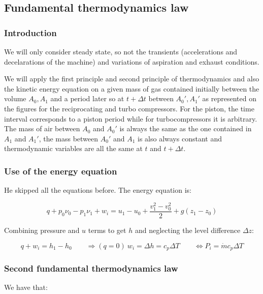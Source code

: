 \subsection{Fundamental thermodynamics law}
\subsubsection{Introduction}
We will only consider steady state, so not the transients (accelerations and decelarations of the machine) and variations of aspiration and exhaust conditions. 


We will apply the first principle and second principle of thermodynamics and also the kinetic energy equation on a given mass of gas contained initially between the volume $A_0, A_1$ and a period later so at $t+\Delta t$ between $A_0', A_1'$ as represented on the figures for the reciprocating and turbo compressors. For the piston, the time interval corresponds to a piston period while for turbocompressors it is arbitrary. The mass of air between $A_0$ and $A_0'$ is always the same as the one contained in $A_1$ and $A_1'$, the mass between $A_0'$ and $A_1$ is also always constant and thermodynamic variables are all the same at $t$ and $t+ \Delta t$.

\subsubsection{Use of the energy equation}
He skipped all the equations before. The energy equation is: 

\begin{equation}
q + p_0 \nu_0 - p_1 \nu _1 + w_i = u_1 - u_0 + \frac{v_1 ^2 - v_0^2}{2} + g(z_1-z_0)
\end{equation}

Combining pressure and $u$ terms to get $h$ and neglecting the level difference $\Delta z$: 

\begin{equation}
q + w_i = h_1 - h_0  \qquad \Rightarrow (q= 0) \ w_i = \Delta h = c_p \Delta T\qquad  \Leftrightarrow P_i = \dot{m} c_p \Delta T
\end{equation}

\subsubsection{Second fundamental thermodynamics law}
We have that: 

